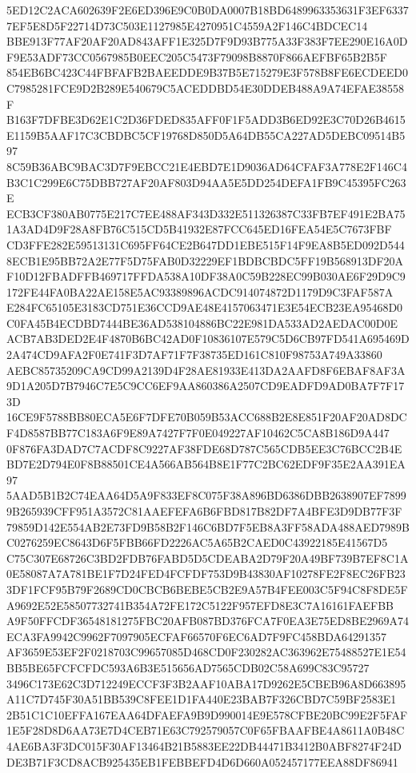 \documentclass[UTF8,fontset=fandol,zihao=-4,a4paper]{ctexart}
\begin{document}
{{5ED12C2ACA602639F2E6ED396E9C0B0DA0007B18BD6489963353631F3EF63377EF5E8D5F22714D73C503E1127985E4270951C4559A2F146C4BDCEC14
BBE913F77AF20AF20AD843AFF1E325D7F9D93B775A33F383F7EE290E16A0DF9E53ADF73CC0567985B0EEC205C5473F79098B8870F866AEFBF65B2B5F
854EB6BC423C44FBFAFB2BAEEDDE9B37B5E715279E3F578B8FE6ECDEED0C7985281FCE9D2B289E540679C5ACEDDBD54E30DDEB488A9A74EFAE38558F
B163F7DFBE3D62E1C2D36FDED835AFF0F1F5ADD3B6ED92E3C70D26B4615E1159B5AAF17C3CBDBC5CF19768D850D5A64DB55CA227AD5DEBC09514B597
8C59B36ABC9BAC3D7F9EBCC21E4EBD7E1D9036AD64CFAF3A778E2F146C4B3C1C299E6C75DBB727AF20AF803D94AA5E5DD254DEFA1FB9C45395FC263E
ECB3CF380AB0775E217C7EE488AF343D332E511326387C33FB7EF491E2BA751A3AD4D9F28A8FB76C515CD5B41932E87FCC645ED16FEA54E5C7673FBF
CD3FFE282E59513131C695FF64CE2B647DD1EBE515F14F9EA8B5ED092D5448ECB1E95BB72A2E77F5D75FAB0D32229EF1BDBCBDC5FF19B568913DF20A
F10D12FBADFFB469717FFDA538A10DF38A0C59B228EC99B030AE6F29D9C9172FE44FA0BA22AE158E5AC93389896ACDC914074872D1179D9C3FAF587A
E284FC65105E3183CD751E36CCD9AE48E4157063471E3E54ECB23EA95468D0C0FA45B4ECDBD7444BE36AD538104886BC22E981DA533AD2AEDAC00D0E
ACB7AB3DED2E4F4870B6BC42AD0F10836107E579C5D6CB97FD541A695469D2A474CD9AFA2F0E741F3D7AF71F7F38735ED161C810F98753A749A33860
AEBC85735209CA9CD99A2139D4F28AE81933E413DA2AAFD8F6EBAF8AF3A9D1A205D7B7946C7E5C9CC6EF9AA860386A2507CD9EADFD9AD0BA7F7F173D
16CE9F5788BB80ECA5E6F7DFE70B059B53ACC688B2E8E851F20AF20AD8DCF4D8587BB77C183A6F9E89A7427F7F0E049227AF10462C5CA8B186D9A447
0F876FA3DAD7C7ACDF8C9227AF38FDE68D787C565CDB5EE3C76BCC2B4EBD7E2D794E0F8B88501CE4A566AB564B8E1F77C2BC62EDF9F35E2AA391EA97
5AAD5B1B2C74EAA64D5A9F833EF8C075F38A896BD6386DBB2638907EF78999B265939CFF951A3572C81AAEFEFA6B6FBD817B82DF7A4BFE3D9DB77F3F
79859D142E554AB2E73FD9B58B2F146C6BD7F5EB8A3FF58ADA488AED7989BC0276259EC8643D6F5FBB66FD2226AC5A65B2CAED0C43922185E41567D5
C75C307E68726C3BD2FDB76FABD5D5CDEABA2D79F20A49BF739B7EF8C1A0E58087A7A781BE1F7D24FED4FCFDF753D9B43830AF10278FE2F8EC26FB23
3DF1FCF95B79F2689CD0CBCB6BEBE5CB2E9A57B4FEE003C5F94C8F8DE5FA9692E52E58507732741B354A72FE172C5122F957EFD8E3C7A16161FAEFBB
A9F50FFCDF36548181275FBC20AFB087BD376FCA7F0EA3E75ED8BE2969A74ECA3FA9942C9962F7097905ECFAF66570F6EC6AD7F9FC458BDA64291357
AF3659E53EF2F0218703C99657085D468CD0F230282AC363962E75488527E1E54BB5BE65FCFCFDC593A6B3E515656AD7565CDB02C58A699C83C95727
3496C173E62C3D712249ECCF3F3B2AAF10ABA17D9262E5CBEB96A8D663895A11C7D745F30A51BB539C8FEE1D1FA440E23BAB7F326CBD7C59BF2583E1
2B51C1C10EFFA167EAA64DFAEFA9B9D990014E9E578CFBE20BC99E2F5FAF1E5F28D8D6AA73E7D4CEB71E63C792579057C0F65FBAAFBE4A8611A0B48C
4AE6BA3F3DC015F30AF13464B21B5883EE22DB44471B3412B0ABF8274F24DDE3B71F3CD8ACB925435EB1FEBBEFD4D6D660A052457177EEA88DF86941
}}
\end{document}

